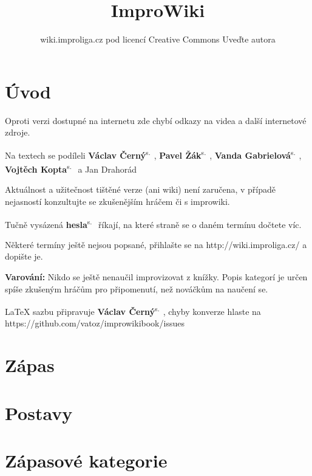 \documentclass[a4paper,10pt,openany]{book}
\title{ImproWiki}
\author{wiki.improliga.cz pod licencí Creative Commons Uveďte autora}
\newcommand{\odkaz}[2]{\textbf{#1}\textsuperscript{s.~\pageref{#2}}}
\begin{document}
\begin{titlepage}
\maketitle
\end{titlepage}
 
\chapter{Úvod}\label{úvod}

 

Oproti verzi dostupné na internetu zde chybí odkazy na videa a další internetové zdroje.

Na textech se podíleli \odkaz{Václav Černý}{uživatel:vatoz}, \odkaz{Pavel Žák}{uživatel:just-paja}, \odkaz{Vanda Gabrielová}{uživatel:vandagabi}, \odkaz{Vojtěch Kopta}{uživatel:vojtechkopta} a Jan Drahorád

Aktuálnost a užitečnost tištěné verze (ani wiki) není zaručena, v případě nejasností konzultujte se zkušenějším hráčem či s improwiki.

Tučně vysázená \odkaz{hesla}{úvod} říkají, na které straně se o daném termínu dočtete víc.

Některé termíny ještě nejsou popsané, přihlašte se na http://wiki.improliga.cz/ a dopište je.

\textbf{Varování:} Nikdo se ještě nenaučil improvizovat z knížky. Popis kategorí je určen spíše zkušeným hráčům pro připomenutí, než nováčkům na naučení se.  

\LaTeX{} sazbu připravuje  \odkaz{Václav Černý}{uživatel:vatoz}, chyby konverze hlaste na https://github.com/vatoz/improwikibook/issues
\chapter{Zápas}







\chapter{Postavy}



\chapter{Zápasové kategorie}
\label{zápasové kategorie}
\label{:kategorie:zápasové kategorie}


\end{document}
